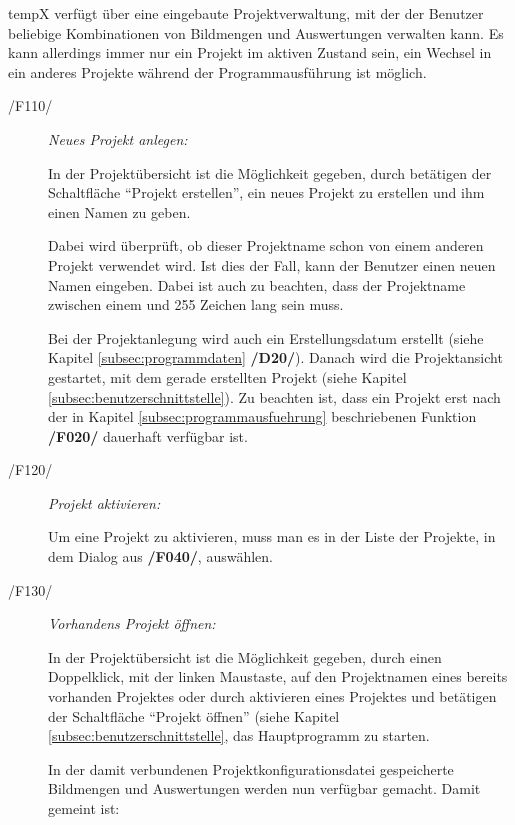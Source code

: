 \label{subsec:projektmanagement}
	
	\gls{tempX} verfügt über eine eingebaute Projektverwaltung, mit der der Benutzer beliebige Kombinationen von Bildmengen und Auswertungen verwalten kann. Es kann allerdings immer nur ein Projekt im aktiven Zustand sein, ein Wechsel in ein anderes Projekte während der Programmausführung ist möglich.
	
	\begin{description}		
		
		\item[/F110/] \textit{Neues Projekt anlegen:}\par In der Projektübersicht ist die Möglichkeit gegeben, durch betätigen der Schaltfläche "`Projekt erstellen"', ein neues Projekt zu erstellen und ihm einen Namen zu geben.\par Dabei wird überprüft, ob dieser Projektname schon von einem anderen Projekt verwendet wird. Ist dies der Fall, kann der Benutzer einen neuen Namen eingeben. Dabei ist auch zu beachten, dass der Projektname zwischen einem und 255 Zeichen lang sein muss.\par Bei der Projektanlegung wird auch ein Erstellungsdatum erstellt (siehe Kapitel \ref{subsec:programmdaten} \textbf{/D20/}). Danach wird die Projektansicht gestartet, mit dem gerade erstellten Projekt (siehe Kapitel \ref{subsec:benutzerschnittstelle}). Zu beachten ist, dass ein Projekt erst nach der in Kapitel \ref{subsec:programmausfuehrung} beschriebenen Funktion \textbf{/F020/} dauerhaft verfügbar ist. 
		
		\item[/F120/] \textit{Projekt aktivieren:}\par Um eine Projekt zu aktivieren, muss man es in der Liste der Projekte, in dem Dialog aus \textbf{/F040/}, auswählen.
		
		\item[/F130/] \textit{Vorhandens Projekt öffnen:}\par In der Projektübersicht ist die Möglichkeit gegeben, durch einen Doppelklick, mit der linken Maustaste, auf den Projektnamen eines bereits vorhanden Projektes oder durch aktivieren eines Projektes und betätigen der Schaltfläche "`Projekt öffnen"' (siehe Kapitel \ref{subsec:benutzerschnittstelle}, das Hauptprogramm zu starten.\par In der damit verbundenen Projektkonfigurationsdatei gespeicherte Bildmengen und Auswertungen werden nun verfügbar gemacht. Damit gemeint ist: 
			

\end{description}
